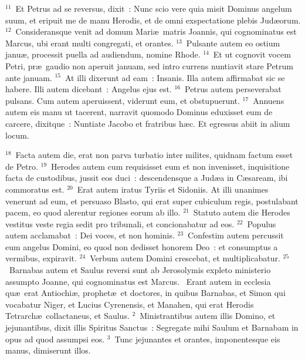 ${}^{11}$~Et Petrus ad se reversus, dixit~: Nunc scio vere quia misit Dominus angelum suum, et eripuit me de manu Herodis, et de omni exspectatione plebis Jud\ae orum.
${}^{12}$~Consideransque venit ad domum Mari\ae\ matris Joannis, qui cognominatus est Marcus, ubi erant multi congregati, et orantes.
${}^{13}$~Pulsante autem eo ostium janu\ae , processit puella ad audiendum, nomine Rhode.
${}^{14}$~Et ut cognovit vocem Petri, pr\ae\ gaudio non aperuit januam, sed intro currens nuntiavit stare Petrum ante januam.
${}^{15}$~At illi dixerunt ad eam~: Insanis. Illa autem affirmabat sic se habere. Illi autem dicebant~: Angelus ejus est.
${}^{16}$~Petrus autem perseverabat pulsans. Cum autem aperuissent, viderunt eum, et obstupuerunt.
${}^{17}$~Annuens autem eis manu ut tacerent, narravit quomodo Dominus eduxisset eum de carcere, dixitque~: Nuntiate Jacobo et fratribus h\ae c. Et egressus abiit in alium locum.


${}^{18}$~Facta autem die, erat non parva turbatio inter milites, quidnam factum esset de Petro.
${}^{19}$~Herodes autem cum requisisset eum et non invenisset, inquisitione facta de custodibus, jussit eos duci~: descendensque a Jud\ae a in C\ae saream, ibi commoratus est.
${}^{20}$~Erat autem iratus Tyriis et Sidoniis. At illi unanimes venerunt ad eum, et persuaso Blasto, qui erat super cubiculum regis, postulabant pacem, eo quod alerentur regiones eorum ab illo.
${}^{21}$~Statuto autem die Herodes vestitus veste regia sedit pro tribunali, et concionabatur ad eos.
${}^{22}$~Populus autem acclamabat~: Dei voces, et non hominis.
${}^{23}$~Confestim autem percussit eum angelus Domini, eo quod non dedisset honorem Deo~: et consumptus a vermibus, expiravit.
${}^{24}$~Verbum autem Domini crescebat, et multiplicabatur.
${}^{25}$~Barnabas autem et Saulus reversi sunt ab Jerosolymis expleto ministerio assumpto Joanne, qui cognominatus est Marcus.
~\lettrine[lines=10,image=true,loversize=0.05,lraise=-0.03]{E}{}rant autem in ecclesia qu\ae\ erat Antiochi\ae , prophet\ae\ et doctores, in quibus Barnabas, et Simon qui vocabatur Niger, et Lucius Cyrenensis, et Manahen, qui erat Herodis Tetrarch\ae\ collactaneus, et Saulus.
${}^{2}$~Ministrantibus autem illis Domino, et jejunantibus, dixit illis Spiritus Sanctus~: Segregate mihi Saulum et Barnabam in opus ad quod assumpsi eos.
${}^{3}$~Tunc jejunantes et orantes, imponentesque eis manus, dimiserunt illos.


